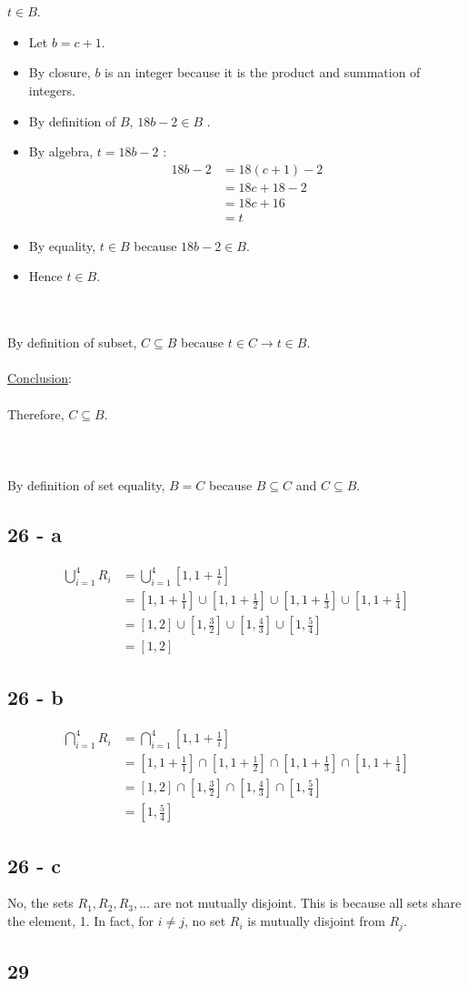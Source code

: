 \documentclass[12pt]{article}
\newcommand{\xlist}[1]{
    \begin{itemize}
        \renewcommand{\labelitemi}{$\centerdot$}
        #1
    \end{itemize}
    \newblock
    \\ \\
}
\newcommand{\xconclusion}[1]{
    \underline{Conclusion}:
    \\ \\
    #1
    \\ \\
}
\begin{document}
\\ \\
$t \in B$.
\xlist{
    \item Let $b = c+1$.
    \item By closure, $b$ is an integer because it is the product and summation of integers.
    \item By definition of $B$, $18b - 2 \in B$ .
    \item By algebra, $t = 18b - 2$ :
    \begin{align*}
        18b - 2 &= 18(c+1) - 2 \\
        &= 18c + 18 - 2 \\
        &= 18c + 16 \\
        &= t
    \end{align*}
    \item By equality, $t \in B$ because $18b - 2 \in B$.
    \item Hence $t \in B$.
}
By definition of subset, $C \subseteq B$ because $t \in C \rightarrow t \in B$.
\\ \\
\xconclusion{Therefore, $C \subseteq B$.}
\\ \\
By definition of set equality, $B = C$ because $B \subseteq C$ and $C \subseteq B$.
\subsection*{26 - a}
\begin{align*}
    \bigcup_{i=1}^{4} R_i &= \bigcup_{i=1}^{4} \left[1, 1 + \frac{1}{i}\right] \\
    &= \left[1, 1 + \frac{1}{1}\right]\cup \left[1, 1 + \frac{1}{2}\right]\cup \left[1, 1 + \frac{1}{3}\right]\cup \left[1, 1 + \frac{1}{4}\right] \\
    &= \left[1, 2\right] \cup \left[1, \frac{3}{2}\right] \cup \left[1, \frac{4}{3}\right] \cup \left[1, \frac{5}{4}\right] \\
    &= \left[1, 2\right]
\end{align*}
\subsection*{26 - b}
\begin{align*}
    \bigcap_{i=1}^{4} R_i &= \bigcap_{i=1}^{4} \left[1, 1 + \frac{1}{i}\right] \\
    &= \left[1, 1 + \frac{1}{1}\right]\cap \left[1, 1 + \frac{1}{2}\right]\cap \left[1, 1 + \frac{1}{3}\right]\cap \left[1, 1 + \frac{1}{4}\right] \\
    &= \left[1, 2\right] \cap \left[1, \frac{3}{2}\right] \cap \left[1, \frac{4}{3}\right] \cap \left[1, \frac{5}{4}\right] \\
    &= \left[1, \frac{5}{4}\right]
\end{align*}
\subsection*{26 - c}
No, the sets $R_1, R_2, R_3,$... are not mutually disjoint. 
This is because all sets share the element, 1. In fact, for $i \neq j$, no set $R_i$ is mutually disjoint from $R_j$. 

\subsection*{29}
\end{document}
